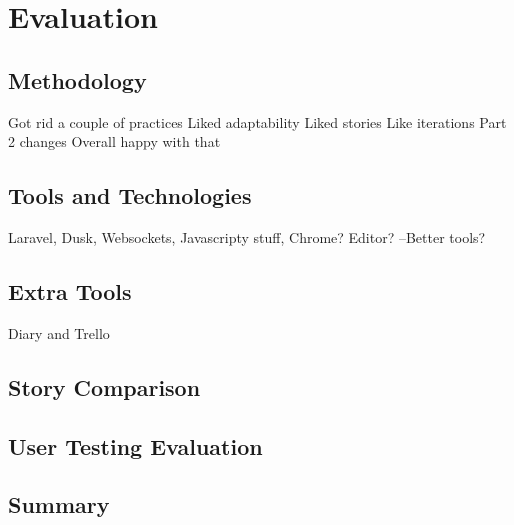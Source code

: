 \chapter{Evaluation}

\section{Methodology}
Got rid a couple of practices
Liked adaptability
Liked stories
Like iterations
Part 2 changes
Overall happy with that
\section{Tools and Technologies}
Laravel, Dusk, Websockets, Javascripty stuff, Chrome? Editor? --Better tools?
\section{Extra Tools}
Diary and Trello
\section{Story Comparison}
\section{User Testing Evaluation}
\section{Summary}